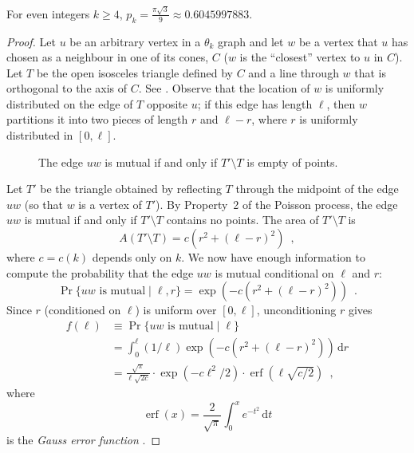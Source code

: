 \documentclass{patmorin}
\DeclareMathOperator{\erf}{erf}
\begin{document}
\begin{lem}
 For even integers $k\ge 4$, $p_k=\frac{\pi\sqrt{3}}{9}\approx 0.6045997883$.
\end{lem}

\begin{proof}
  Let $u$ be an arbitrary vertex in a $\theta_k$ graph and let $w$
  be a vertex that $u$ has chosen as a neighbour in one of its cones,
  $C$ ($w$ is the ``closest'' vertex to $u$ in $C$).  Let $T$ be the
  open isosceles triangle defined by $C$ and a line
  through $w$ that is orthogonal to the axis of $C$. See .
  Observe that the location of $w$ is uniformly distributed on the
  edge of $T$ opposite $u$;  if this edge has length $\ell$, then $w$
  partitions it into two pieces of length $r$ and $\ell-r$, where $r$
  is uniformly distributed in $[0,\ell]$.

  \begin{figure}
    \caption{The edge $uw$ is mutual if and only if $T'\setminus T$ 
       is empty of points.}
  \end{figure}
 
  Let $T'$ be the triangle obtained by reflecting $T$ through the midpoint
  of the edge $uw$ (so that $w$ is a vertex of $T'$). By Property~2 of the
  Poisson process, the edge $uw$ is mutual if and only if $T'\setminus T$
  contains no points.  The area of $T'\setminus T$ is
  \[
     A(T'\setminus T) = c(r^2+(\ell-r)^2)  \enspace ,
  \]
  where $c=c(k)$ depends only on $k$.  We now have enough information
  to compute the probability that the edge $uw$ is mutual conditional
  on $\ell$ and $r$:
  \[
    \Pr\{\mbox{$uw$ is mutual} \mid \ell,r\} = \exp(-c(r^2+(\ell-r)^2))
      \enspace .
  \]
  Since $r$ (conditioned on $\ell$) is uniform over $[0,\ell]$, unconditioning
  $r$ gives
  \begin{align*}
    f(\ell) & \equiv \Pr\{\mbox{$uw$ is mutual} \mid \ell\} \\
     & = \int_0^\ell (1/\ell)\exp(-c(r^2+(\ell-r)^2))\,\mathrm{d}r \\
     & = \frac{\sqrt{\pi}}{\ell\sqrt{2c}}
            \cdot\exp(-c\ell^2/2)
            \cdot\erf(\ell\sqrt{c/2})  \enspace ,
  \end{align*}
  where 
  \[ \erf(x)=\frac{2}{\sqrt{\pi}}\int_0^x e^{-t^2}\,\mathrm{d}t \]
  is the \emph{Gauss error function} \cite{gauss-error}.  


\end{proof}
\end{document}
